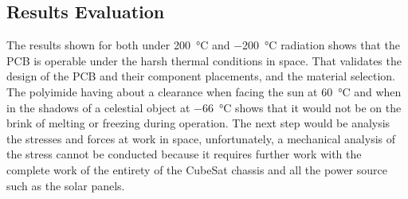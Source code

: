 \subsection{Results Evaluation}

The results shown for both under \SI{+200}{\celsius} and \SI{-200}{\celsius} radiation shows that
the PCB is operable under the harsh thermal conditions in space. That
validates the design of the PCB and their component placements, and the
material selection. The polyimide having about a clearance when facing
the sun at \SI{60}{\celsius} and when in the shadows of a celestial object at \SI{-66}{\celsius}
shows that it would not be on the brink of melting or freezing during
operation. The next step would be analysis the stresses and forces at
work in space, unfortunately, a mechanical analysis of the stress cannot
be conducted because it requires further work with the complete work of
the entirety of the CubeSat chassis and all the power source such as the
solar panels.
